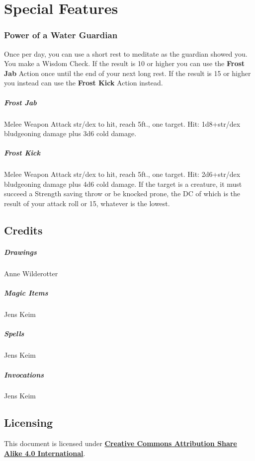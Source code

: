 \documentclass[letter,10pt,twocolumn,openany]{dndbook}
\begin{document}
\chapter{Special Features}

\subsection{Power of a Water Guardian}

Once per day, you can use a short rest to meditate as the guardian showed you. You make a Wisdom Check. If the result is 10 or higher you can use the \textbf{Frost Jab} Action once until the end of your next long rest. If the result is 15 or higher you instead can use the \textbf{Frost Kick} Action instead.

\paragraph{Frost Jab} Melee Weapon Attack str/dex to hit, reach 5ft., one target. Hit: 1d8+str/dex bludgeoning damage plus 3d6 cold damage.

\paragraph{Frost Kick} Melee Weapon Attack str/dex to hit, reach 5ft., one target. Hit: 2d6+str/dex bludgeoning damage plus 4d6 cold damage. If the target is a creature, it must succeed a Strength saving throw or be knocked prone, the DC of which is the result of your attack roll or 15, whatever is the lowest.

\backmatter

\section{Credits}

\paragraph{Drawings} Anne Wilderotter
\paragraph{Magic Items} Jens Keim
\paragraph{Spells} Jens Keim
\paragraph{Invocations} Jens Keim

\section{Licensing}

This document is licensed under \href{https://creativecommons.org/licenses/by-sa/4.0/legalcode}{\textbf{Creative Commons Attribution Share Alike 4.0 International}}.
\end{document}
